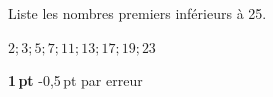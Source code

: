 \question[1]
Liste les nombres premiers inférieurs à 25.

\vspace{10pt}{\footnotesize\raggedleft Espace pour ta démarche et tes calculs\par}
	\begin{solutionorgrid}[80pt]
	
		\vspace{10pt}
		$2; 3; 5; 7; 11; 13; 17; 19; 23$
		
		\vspace{10pt}\textbf{1\,pt} -0,5\,pt par erreur
	\end{solutionorgrid}

